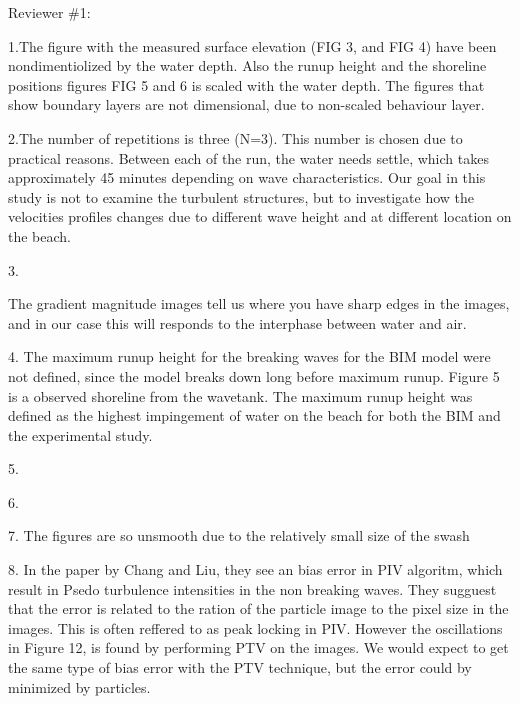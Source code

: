 Reviewer \#1:

1.The figure with the measured surface elevation (FIG 3, and  FIG 4) have been  nondimentiolized  by the water depth. Also the runup height and the shoreline positions figures FIG 5 and 6 is scaled with the water depth. The figures that show boundary layers are not dimensional, due to non-scaled behaviour layer. 


2.The number of repetitions is three (N=3). This number is chosen due to practical reasons. Between each of the run, the water needs settle, which takes approximately 45 minutes depending on wave characteristics. Our goal in this study is not to examine the turbulent structures, but to investigate how the velocities profiles changes due to different wave height and at different location on the beach.

3.

 The gradient magnitude images tell us where you have sharp edges in the images, and in our case this will responds to the interphase between water and air. 



4. The maximum runup height for the breaking waves for the BIM model were not defined, since the model breaks down long before maximum runup. Figure 5 is a observed shoreline from the wavetank. The maximum runup height was defined as the highest impingement of water on the beach for both the BIM and the experimental study. 

5.


6. 

7. The figures are so unsmooth due to the relatively small size of the swash 


8. In the paper by Chang and Liu, they see an bias error in PIV algoritm, which result in Psedo turbulence intensities in the non breaking waves. They sugguest that the error is related to the ration of the particle image to the pixel size in the images. This is often reffered to as peak locking in PIV. However the oscillations in Figure 12, is found by  performing PTV on the images. We would expect to get the same type of bias error with the PTV technique, but the error could by minimized by particles. 
